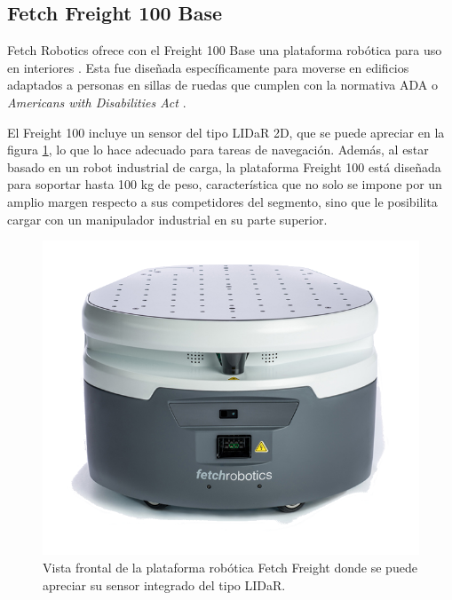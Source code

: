 \subsection{Fetch Freight 100 Base}

Fetch Robotics ofrece con el Freight 100 Base una plataforma robótica para uso en interiores \citep{PAPER:1}. Esta fue diseñada específicamente para moverse en edificios adaptados a personas en sillas de ruedas que cumplen con la normativa ADA o \textit{Americans with Disabilities Act} \citep{ACT:1}.

El Freight 100 incluye un sensor del tipo LIDaR 2D, que se puede apreciar en la figura \ref{fig:robotFreight}, lo que lo hace adecuado para tareas de navegación. Además, al estar basado en un robot industrial de carga, la plataforma Freight 100 está diseñada para soportar hasta 100 kg de peso, característica que no solo se impone por un amplio margen respecto a sus competidores del segmento, sino que le posibilita cargar con un manipulador industrial en su parte superior.

\begin{figure}[ht]
	\centering
	\includegraphics[scale=1.0]{./Figures/freight.png}
	\caption{Vista frontal de la plataforma robótica Fetch Freight donde se puede apreciar su sensor integrado del tipo LIDaR.\protect\footnotemark}
	\label{fig:robotFreight}
\end{figure}



